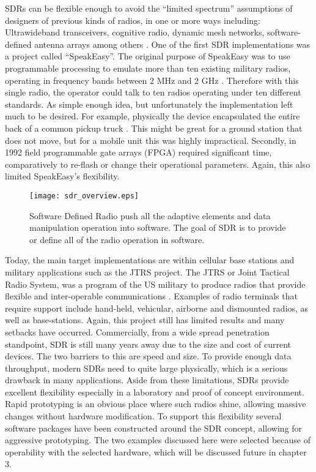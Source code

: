SDRs can be flexible enough to avoid the ``limited spectrum'' assumptions of designers of previous kinds of radios, in one or more ways including: Ultrawideband transceivers, cognitive radio, dynamic mesh networks, software-defined antenna arrays among others \cite{22}.  One of the first SDR implementations was a project called ``SpeakEasy''.  The original purpose of SpeakEasy was to use programmable processing to emulate more than ten existing military radios, operating in frequency bands between 2 MHz and 2 GHz \cite{23}.  Therefore with this single radio, the operator could talk to ten radios operating under ten different standards.  As simple enough idea, but unfortunately the implementation left much to be desired.  For example, physically the device encapsulated the entire back of a common pickup truck \cite{23}.  This might be great for a ground station that does not move, but for a mobile unit this was highly impractical.  Secondly, in 1992 field programmable gate arrays (FPGA) required significant time, comparatively to re-flash or change their operational parameters.  Again, this also limited SpeakEasy's flexibility.\\

\begin{figure}\label{sdr_overview}
\centering
\texttt{[image: sdr\_overview.eps]}
\caption{Software Defined Radio push all the adaptive elements and data manipulation operation into software.  The goal of SDR is to provide or define all of the radio operation in software.}
\end{figure}

Today, the main target implementations are within cellular base stations and military applications such as the JTRS project.  The JTRS or Joint Tactical Radio System, was a program of the US military to produce radios that provide flexible and inter-operable communications \cite{JTRS}. Examples of radio terminals that require support include hand-held, vehicular, airborne and dismounted radios, as well as base-stations\cite{24}.  Again, this project still has limited results and many setbacks have occurred.  Commercially, from a wide spread penetration standpoint, SDR is still many years away due to the size and cost of current devices.  The two barriers to this are speed and size.  To provide enough data throughput, modern SDRs need to quite large physically, which is a serious drawback in many applications.   Aside from these limitations, SDRs provide excellent flexibility especially in a laboratory and proof of concept environment.  Rapid prototyping is an obvious place where such radios shine, allowing massive changes without hardware modification.  To support this flexibility several software packages have been constructed around the SDR concept, allowing for aggressive prototyping.  The two examples discussed here were selected because of operability with the selected hardware, which will be discussed future in chapter 3.\\

